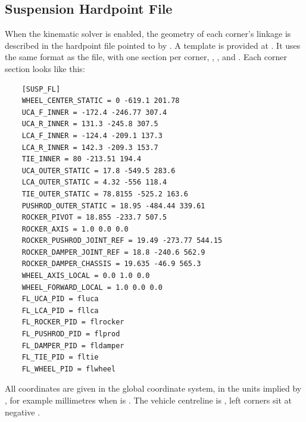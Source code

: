 \subsection{Suspension Hardpoint File}
When the kinematic solver is enabled, the geometry of each corner's linkage is described in the hardpoint file pointed to by . A template is provided at . It uses the same format as the  file, with one section per corner, \codeword{[SUSP_FL]}, \codeword{[SUSP_FR]}, \codeword{[SUSP_RL]} and \codeword{[SUSP_RR]}. Each corner section looks like this:
\begin{lstlisting}
    [SUSP_FL]
    WHEEL_CENTER_STATIC = 0 -619.1 201.78
    UCA_F_INNER = -172.4 -246.77 307.4
    UCA_R_INNER = 131.3 -245.8 307.5
    LCA_F_INNER = -124.4 -209.1 137.3
    LCA_R_INNER = 142.3 -209.3 153.7
    TIE_INNER = 80 -213.51 194.4
    UCA_OUTER_STATIC = 17.8 -549.5 283.6
    LCA_OUTER_STATIC = 4.32 -556 118.4
    TIE_OUTER_STATIC = 78.8155 -525.2 163.6
    PUSHROD_OUTER_STATIC = 18.95 -484.44 339.61
    ROCKER_PIVOT = 18.855 -233.7 507.5
    ROCKER_AXIS = 1.0 0.0 0.0
    ROCKER_PUSHROD_JOINT_REF = 19.49 -273.77 544.15
    ROCKER_DAMPER_JOINT_REF = 18.8 -240.6 562.9
    ROCKER_DAMPER_CHASSIS = 19.635 -46.9 565.3
    WHEEL_AXIS_LOCAL = 0.0 1.0 0.0
    WHEEL_FORWARD_LOCAL = 1.0 0.0 0.0
    FL_UCA_PID = fluca
    FL_LCA_PID = fllca
    FL_ROCKER_PID = flrocker
    FL_PUSHROD_PID = flprod
    FL_DAMPER_PID = fldamper
    FL_TIE_PID = fltie
    FL_WHEEL_PID = flwheel
\end{lstlisting}
All coordinates are given in the global coordinate system, in the units implied by , for example millimetres when  is . The vehicle centreline is , left corners sit at negative .

